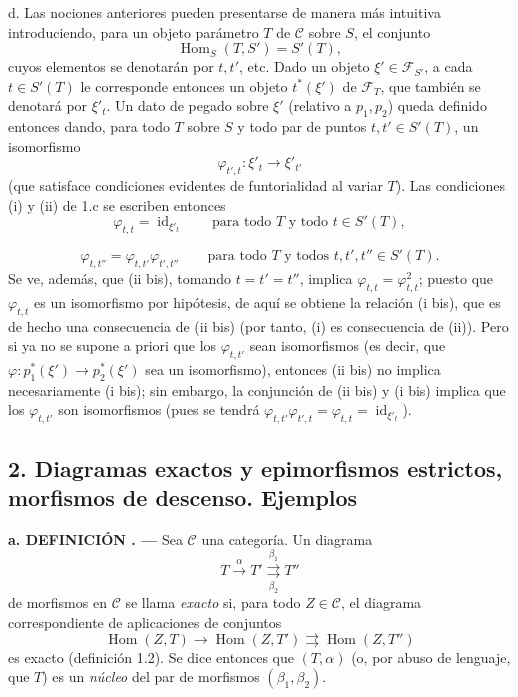 \documentclass[11pt,twoside,openany]{book}
\numberwithin{equation}{section}
\newcommand{\src}[1]{%
  \phantomsection\hypertarget{src:#1}{}%
  \marginpar{\raggedleft\footnotesize\sffamily #1}%
}
\theoremstyle{plain}
\theoremstyle{definition}
\theoremstyle{remark}
\newcommand{\result}[2]{%
  \par\medskip\noindent\textbf{#1%
  \if\relax\detokenize{#2}\relax\else\space#2\fi. ---}\enspace
}
\newcommand{\FgaUnitKey}{frontmatter}
\renewcommand{\src}[1]{%
  \phantomsection\hypertarget{src:\FgaUnitKey:#1}{}%
  \marginpar{\raggedleft\footnotesize\sffamily #1}%
}
\theoremstyle{plain}
\theoremstyle{definition}
\theoremstyle{remark}
\begin{document}
\medskip\noindent
d. Las nociones anteriores pueden presentarse de manera más intuitiva
introduciendo, para un objeto parámetro $T$ de $\mathcal C$ sobre $S$, el
conjunto
\[
  \operatorname{Hom}_S(T,S')=S'(T),
\]
cuyos elementos se denotarán por $t,t'$, etc. Dado un objeto
$\xi'\in\mathcal F_{S'}$, a cada $t\in S'(T)$ le corresponde entonces un objeto
$t^*(\xi')$ de $\mathcal F_T$, que también se denotará por $\xi'_t$. Un dato de
pegado sobre $\xi'$ (relativo a $p_1,p_2$) queda definido entonces dando, para
todo $T$ sobre $S$ y todo par de puntos $t,t'\in S'(T)$, un isomorfismo
\[
  \varphi_{t',t}:\xi'_t\longrightarrow\xi'_{t'}
\]
(que satisface condiciones evidentes de funtorialidad al variar $T$). Las
condiciones (i) y (ii) de 1.c se escriben entonces
\[
  \tag{i bis}
  \varphi_{t,t}=\operatorname{id}_{\xi'_t}
  \qquad\text{para todo $T$ y todo $t\in S'(T)$},
\]

\src{304}
\[
  \tag{ii bis}
  \varphi_{t,t''}=\varphi_{t,t'}\varphi_{t',t''}
  \qquad\text{para todo $T$ y todos $t,t',t''\in S'(T)$}.
\]
Se ve, además, que (ii bis), tomando $t=t'=t''$, implica
$\varphi_{t,t}=\varphi_{t,t}^2$; puesto que $\varphi_{t,t}$ es un isomorfismo
por hipótesis, de aquí se obtiene la relación (i bis), que es de hecho una
consecuencia de (ii bis) (por tanto, (i) es consecuencia de (ii)). Pero si ya
no se supone a priori que los $\varphi_{t,t'}$ sean isomorfismos (es decir, que
$\varphi:p_1^*(\xi')\longrightarrow p_2^*(\xi')$ sea un isomorfismo), entonces
(ii bis) no implica necesariamente (i bis); sin embargo, la conjunción de
(ii bis) y (i bis) implica que los $\varphi_{t,t'}$ son isomorfismos (pues se
tendrá
$\varphi_{t,t'}\varphi_{t',t}=\varphi_{t,t}=\operatorname{id}_{\xi'_t}$).

\subsection*{2. Diagramas exactos y epimorfismos estrictos, morfismos de
descenso. Ejemplos}

\result{a. DEFINICIÓN}{2.1} Sea $\mathcal C$ una categoría. Un diagrama
\[
  T\xrightarrow{\alpha}T'
  \overset{\beta_1}{\underset{\beta_2}{\rightrightarrows}}T''
\]
de morfismos en $\mathcal C$ se llama \emph{exacto} si, para todo
$Z\in\mathcal C$, el diagrama correspondiente de aplicaciones de conjuntos
\[
  \operatorname{Hom}(Z,T)\longrightarrow
  \operatorname{Hom}(Z,T')
  \rightrightarrows\operatorname{Hom}(Z,T'')
\]
es exacto (definición 1.2). Se dice entonces que $(T,\alpha)$ (o, por abuso de
lenguaje, que $T$) es un \emph{núcleo} del par de morfismos
$(\beta_1,\beta_2)$.
\end{document}
